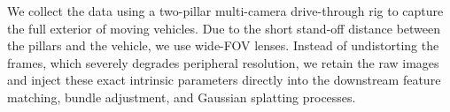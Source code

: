 \documentclass[letterpaper, 10 pt, conference]{ieeeconf}  %
\begin{document}






We collect the data using a two-pillar multi-camera drive-through rig to capture the full exterior of moving vehicles. Due to the short stand-off distance between the pillars and the vehicle, we use wide-FOV lenses. 
Instead of undistorting the frames, which severely degrades peripheral resolution, we retain the raw images and inject these exact intrinsic parameters directly into the downstream feature matching, bundle adjustment, and Gaussian splatting processes.
\end{document}
